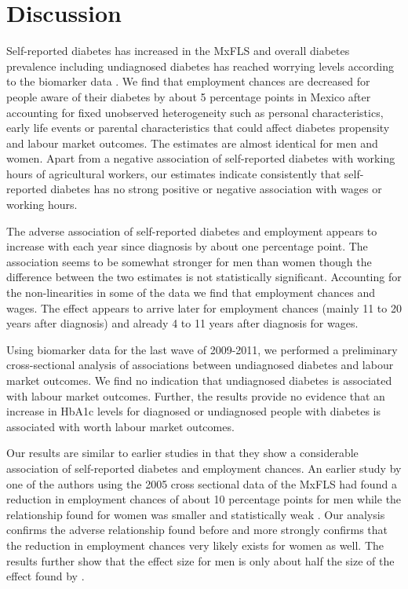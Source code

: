 \section{\noindent \label{sec:Conclusion}Discussion}

Self-reported diabetes has increased in the \ac{MxFLS} and overall
diabetes prevalence including undiagnosed diabetes has reached worrying
levels according to the biomarker data \citep{Frankenberg2015}. We
find that employment chances are decreased for people aware of their
diabetes by about 5 percentage points in Mexico after accounting for
fixed unobserved heterogeneity such as personal characteristics, early
life events or parental characteristics that could affect diabetes
propensity and labour market outcomes. The estimates are almost identical
for men and women. Apart from a negative association of self-reported
diabetes with working hours of agricultural workers, our estimates
indicate consistently that self-reported diabetes has no strong positive
or negative association with wages or working hours. 

The adverse association of self-reported diabetes and employment appears
to increase with each year since diagnosis by about one percentage
point. The association seems to be somewhat stronger for men than
women though the difference between the two estimates is not statistically
significant. Accounting for the non-linearities in some of the data
we find that employment chances and wages. The effect appears to arrive
later for employment chances (mainly 11 to 20 years after diagnosis)
and already 4 to 11 years after diagnosis for wages. 

Using biomarker data for the last wave of 2009-2011, we performed
a preliminary cross-sectional analysis of associations between undiagnosed
diabetes and labour market outcomes. We find no indication that undiagnosed
diabetes is associated with labour market outcomes. Further, the results
provide no evidence that an increase in \ac{HbA1c} levels for diagnosed
or undiagnosed people with diabetes is associated with worth labour
market outcomes.

Our results are similar to earlier studies in that they show a considerable
association of self-reported diabetes and employment chances. An earlier
study by one of the authors using the 2005 cross sectional data of
the \ac{MxFLS} had found a reduction in employment chances of about
10 percentage points for men while the relationship found for women
was smaller and statistically weak \citep{Seuring2015}. Our analysis
confirms the adverse relationship found before and more strongly confirms
that the reduction in employment chances very likely exists for women
as well. The results further show that the effect size for men is
only about half the size of the effect found by \citet{Seuring2015}. 

